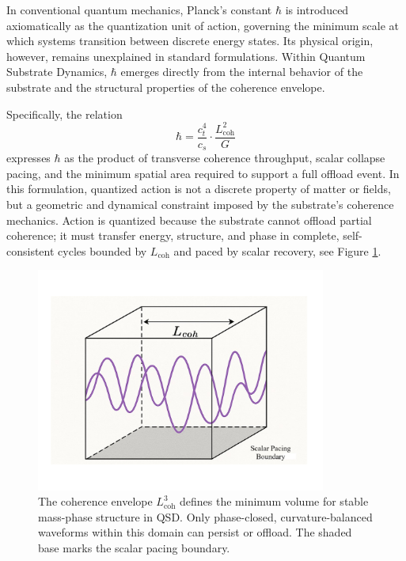 \documentclass[entropy,article,submit,pdftex,moreauthors]{Definitions/mdpi}
\begin{document}
In conventional quantum mechanics, Planck’s constant \texorpdfstring{\( \hbar \)}{hbar} is introduced axiomatically as the quantization unit of action, governing the minimum scale at which systems transition between discrete energy states. Its physical origin, however, remains unexplained in standard formulations. Within Quantum Substrate Dynamics, \texorpdfstring{\( \hbar \)}{hbar} emerges directly from the internal behavior of the substrate and the structural properties of the coherence envelope.

Specifically, the relation
\[
\hbar = \frac{c_t^4}{c_s} \cdot \frac{L_{\text{coh}}^2}{G}
\]
expresses \texorpdfstring{\( \hbar \)}{hbar} as the product of transverse coherence throughput, scalar collapse pacing, and the minimum spatial area required to support a full offload event. In this formulation, quantized action is not a discrete property of matter or fields, but a geometric and dynamical constraint imposed by the substrate’s coherence mechanics. Action is quantized because the substrate cannot offload partial coherence; it must transfer energy, structure, and phase in complete, self-consistent cycles bounded by \texorpdfstring{\( L_{\text{coh}} \)}{Lcoh} and paced by scalar recovery, see Figure \ref{fig:lcoh}.

\begin{figure}[htbp]
\centering
\includegraphics[width=0.85\textwidth]{figures/Lcoh.pdf}
\caption{The coherence envelope \( L_{\text{coh}}^3 \) defines the minimum volume for stable mass-phase structure in QSD. Only phase-closed, curvature-balanced waveforms within this domain can persist or offload. The shaded base marks the scalar pacing boundary.}
\label{fig:lcoh}
\end{figure}
\end{document}
